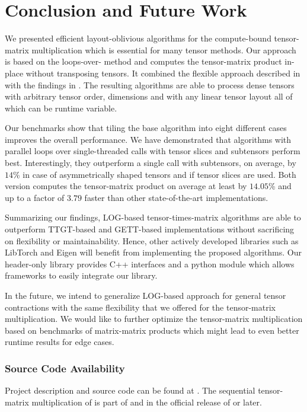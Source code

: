 \section{Conclusion and Future Work}
\label{sec:conclusion}
We presented efficient layout-oblivious algorithms for the compute-bound tensor-matrix multiplication which is essential for many tensor methods.
Our approach is based on the loops-over- method and computes the tensor-matrix product in-place without transposing tensors.
It combined the flexible approach described in \cite{bassoy:2019:ttv} with the findings in \cite{li:2015:input}.
The resulting algorithms are able to process dense tensors with arbitrary tensor order, dimensions and with any linear tensor layout all of which can be runtime variable.

Our benchmarks show that tiling the base algorithm into eight different  cases improves the overall performance.
We have demonstrated that algorithms with parallel loops over single-threaded  calls with tensor slices and subtensors perform best.
Interestingly, they outperform a single  call with subtensors, on average, by $14$\% in case of asymmetrically shaped tensors and if tensor slices are used.
Both version computes the tensor-matrix product on average at least by $14.05$\% and up to a factor of $3.79$ faster than other state-of-the-art implementations.


Summarizing our findings, LOG-based tensor-times-matrix algorithms are able to outperform TTGT-based and GETT-based implementations without sacrificing on flexibility or maintainability.
Hence, other actively developed libraries such as LibTorch and Eigen will benefit from implementing the proposed algorithms.
Our header-only library provides C++ interfaces and a python module which allows frameworks to easily integrate our library.

In the future, we intend to generalize LOG-based approach for general tensor contractions with the same flexibility that we offered for the tensor-matrix multiplication. 
We would like to further optimize the tensor-matrix multiplication based on  benchmarks of matrix-matrix products which might lead to even better runtime results for edge cases.


\subsubsection{Source Code Availability}
Project description and source code can be found at {\footnotesize {}}.
The sequential tensor-matrix multiplication of  is part of  and in the official release of   or later.
